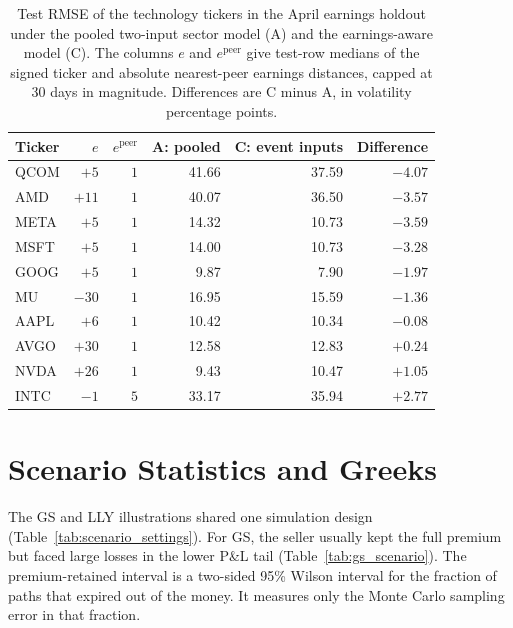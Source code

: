 \begin{table}[H]
\centering
\caption{Test RMSE of the technology tickers in the April earnings holdout under the pooled two-input sector model (A) and the earnings-aware model (C). The columns $e$ and $e^{\mathrm{peer}}$ give test-row medians of the signed ticker and absolute nearest-peer earnings distances, capped at 30 days in magnitude. Differences are C minus A, in volatility percentage points.}\label{tab:tech_pivot}
\begin{tabular}{lrrrrr}
\toprule
Ticker & $e$ & $e^{\mathrm{peer}}$ & A: pooled & C: event inputs & Difference \\
\midrule
QCOM & $+5$  & $1$ & 41.66 & 37.59 & $-4.07$ \\
AMD  & $+11$ & $1$ & 40.07 & 36.50 & $-3.57$ \\
META & $+5$  & $1$ & 14.32 & 10.73 & $-3.59$ \\
MSFT & $+5$  & $1$ & 14.00 & 10.73 & $-3.28$ \\
GOOG & $+5$  & $1$ &  9.87 &  7.90 & $-1.97$ \\
MU   & $-30$ & $1$ & 16.95 & 15.59 & $-1.36$ \\
AAPL & $+6$  & $1$ & 10.42 & 10.34 & $-0.08$ \\
AVGO & $+30$ & $1$ & 12.58 & 12.83 & $+0.24$ \\
NVDA & $+26$ & $1$ &  9.43 & 10.47 & $+1.05$ \\
INTC & $-1$  & $5$ & 33.17 & 35.94 & $+2.77$ \\
\bottomrule
\end{tabular}
\end{table}

\FloatBarrier
\section{Scenario Statistics and Greeks}\label{sec:supp_short_premium}

The GS and LLY illustrations shared one simulation design (Table~\ref{tab:scenario_settings}). For GS, the seller usually kept the full premium but faced large losses in the lower P\&L tail (Table~\ref{tab:gs_scenario}). The premium-retained interval is a two-sided 95\% Wilson interval for the fraction of paths that expired out of the money. It measures only the Monte Carlo sampling error in that fraction.

